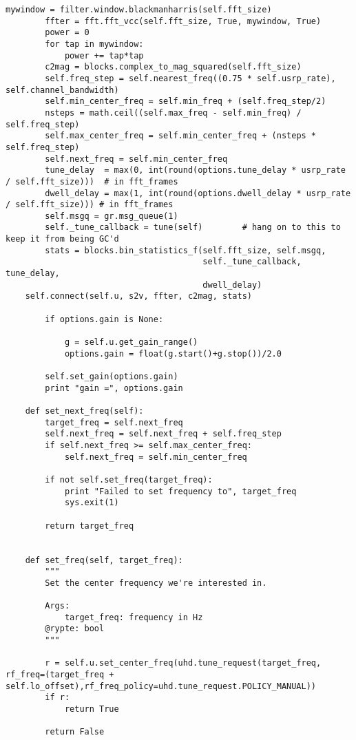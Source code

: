 \begin{lstlisting}[breaklines]
        mywindow = filter.window.blackmanharris(self.fft_size)
        ffter = fft.fft_vcc(self.fft_size, True, mywindow, True)
        power = 0
        for tap in mywindow:
            power += tap*tap
        c2mag = blocks.complex_to_mag_squared(self.fft_size)
        self.freq_step = self.nearest_freq((0.75 * self.usrp_rate), self.channel_bandwidth)
        self.min_center_freq = self.min_freq + (self.freq_step/2)
        nsteps = math.ceil((self.max_freq - self.min_freq) / self.freq_step)
        self.max_center_freq = self.min_center_freq + (nsteps * self.freq_step)
        self.next_freq = self.min_center_freq
        tune_delay  = max(0, int(round(options.tune_delay * usrp_rate / self.fft_size)))  # in fft_frames
        dwell_delay = max(1, int(round(options.dwell_delay * usrp_rate / self.fft_size))) # in fft_frames
        self.msgq = gr.msg_queue(1)
        self._tune_callback = tune(self)        # hang on to this to keep it from being GC'd
        stats = blocks.bin_statistics_f(self.fft_size, self.msgq,
                                        self._tune_callback, tune_delay,
                                        dwell_delay)
	self.connect(self.u, s2v, ffter, c2mag, stats)

        if options.gain is None:

            g = self.u.get_gain_range()
            options.gain = float(g.start()+g.stop())/2.0

        self.set_gain(options.gain)
        print "gain =", options.gain

    def set_next_freq(self):
        target_freq = self.next_freq
        self.next_freq = self.next_freq + self.freq_step
        if self.next_freq >= self.max_center_freq:
            self.next_freq = self.min_center_freq

        if not self.set_freq(target_freq):
            print "Failed to set frequency to", target_freq
            sys.exit(1)

        return target_freq


    def set_freq(self, target_freq):
        """
        Set the center frequency we're interested in.

        Args:
            target_freq: frequency in Hz
        @rypte: bool
        """

        r = self.u.set_center_freq(uhd.tune_request(target_freq, rf_freq=(target_freq + self.lo_offset),rf_freq_policy=uhd.tune_request.POLICY_MANUAL))
        if r:
            return True

        return False


\end{lstlisting}
